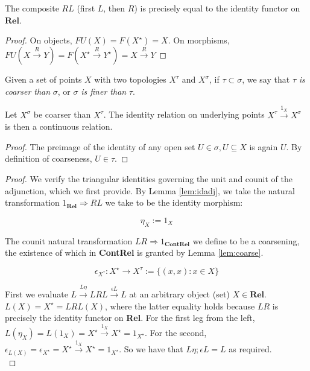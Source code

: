 \begin{marginfigure}
\begin{lemma}[$RL = 1_{\textbf{Rel}}$]\label{lem:idadj}
The composite $RL$ (first $L$, then $R$) is precisely equal to the identity functor on $\mathbf{Rel}$.
\begin{proof}
On objects, $FU(X) = F(X^\star) = X$. On morphisms, $FU(X \overset{R}{\rightarrow} Y) = F(X^\star \overset{R}{\rightarrow} Y^\star) = X \overset{R}{\rightarrow} Y$
\end{proof}
\end{lemma}

\begin{rem}
Given a set of points $X$ with two topologies $X^\tau$ and $X^\sigma$, if $\tau \subset \sigma$, we say that $\tau$ \emph{is coarser than} $\sigma$, or $\sigma$ \emph{is finer than} $\tau$.
\end{rem}

\begin{lemma}\label{lem:coarse}
Let $X^\sigma$ be coarser than $X^\tau$. The identity relation on underlying points $X^\tau \overset{1_X}{\rightarrow} X^\sigma$ is then a continuous relation.
\begin{proof}
The preimage of the identity of any open set $U \in \sigma, U \subseteq X$ is again $U$. By definition of coarseness, $U \in \tau$.
\end{proof}
\end{lemma}

\begin{proposition}[$L \dashv R$]\label{prop:reladj}
\begin{proof}
We verify the triangular identities governing the unit and counit of the adjunction, which we first provide. By Lemma \ref{lem:idadj}, we take the natural transformation $1_\mathbf{Rel} \Rightarrow RL$ we take to be the identity morphism:

\[\eta_{X} := 1_{X}\]

The counit natural transformation $LR \Rightarrow 1_{\mathbf{ContRel}}$ we define to be a coarsening, the existence of which in \textbf{ContRel} is granted by Lemma \ref{lem:coarse}.

\[\epsilon_{X^\tau} : X^\star \rightarrow X^\tau := \{(x,x) : x \in X\}\]

First we evaluate $L \overset{L\eta}{\rightarrow} LRL \overset{\epsilon L}{\rightarrow} L$ at an arbitrary object (set) $X \in \textbf{Rel}$. $L(X) = X^\star = LRL(X)$, where the latter equality holds because $LR$ is precisely the identity functor on \textbf{Rel}. For the first leg from the left, $L(\eta_X) = L(1_X) = X^\star \overset{1_X}{\rightarrow} X^\star = 1_{X^\star}$. For the second, $\epsilon_{L(X)} = \epsilon_{X^\star} = X^\star \overset{1_X}{\rightarrow} X^\star = 1_{X^\star}$. So we have that $L\eta ; \epsilon L = L$ as required.\\


\end{proof}
\end{proposition}
\end{marginfigure}
